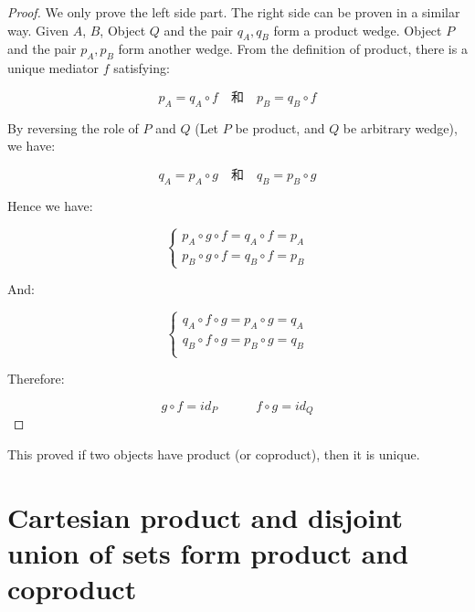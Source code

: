 \documentclass[UTF8]{article}
\begin{document}
\begin{proof}
We only prove the left side part. The right side can be proven in a similar way. Given $A$, $B$, Object $Q$ and the pair $q_A, q_B$ form a product wedge. Object $P$ and the pair $p_A, p_B$ form another wedge. From the definition of product, there is a unique mediator $f$ satisfying:

\[
p_A = q_A \circ f \quad \text{和} \quad p_B = q_B \circ f
\]

By reversing the role of $P$ and $Q$ (Let $P$ be product, and $Q$ be arbitrary wedge), we have:

\[
q_A = p_A \circ g \quad \text{和} \quad q_B = p_B \circ g
\]

Hence we have:

\[
\begin{cases}
p_A \circ g \circ f = q_A \circ f = p_A \\
p_B \circ g \circ f = q_B \circ f = p_B
\end{cases}
\]

And:

\[
\begin{cases}
q_A \circ f \circ g = p_A \circ g = q_A \\
q_B \circ f \circ g = p_B \circ g = q_B \\
\end{cases}
\]

Therefore:

\[
g \circ f = id_P \quad \quad \quad f \circ g = id_Q
\]

\end{proof}

This proved if two objects have product (or coproduct), then it is unique.

\chapter*{Cartesian product and disjoint union of sets form product and coproduct}
\end{document}
